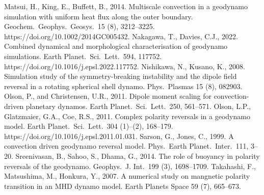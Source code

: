 \begin{thebibliography}{}
%
%
Matsui, H., King, E., Buffett, B., 2014. Multiscale convection in a geodynamo simulation with uniform heat flux along the outer boundary. Geochem.\ Geophys.\ Geosys.\ 15 (8), 3212--3225. https://doi.org/10.1002/2014GC005432.
%
%
{\color{red}
Nakagawa, T., Davies, C.J., 2022. Combined dynamical and morphological characterisation of geodynamo simulations. Earth Planet.\ Sci.\ Lett.\ 594, 117752. https://doi.org/10.1016/j.epsl.2022.117752.
}
%
Nishikawa, N., Kusano, K., 2008. Simulation study of the symmetry-breaking instability and the dipole field reversal in a rotating spherical shell dynamo. Phys.\ Plasmas 15 (8), 082903.
%
%
Olson, P., and Christensen, U.R., 2011. Dipole moment scaling for convection-driven planetary dynamos. Earth Planet.\ Sci.\ Lett.\ 250, 561--571.
%
Olson, L.P., Glatzmaier, G.A., Coe, R.S., 2011. Complex polarity reversals in a geodynamo model. Earth Planet.\ Sci.\ Lett.\ 304 (1)--(2), 168--179. https://doi.org/10.1016/j.epsl.2011.01.031.
%
Sarson, G., Jones, C., 1999. A convection driven geodynamo reversal model. Phys.\ Earth Planet.\ Inter.\ 111, 3--20.
%
Sreenivasan, B., Sahoo, S., Dhama, G., 2014. The role of buoyancy in polarity reversals of the geodynamo. Geophys.\ J. Int.\ 199 (3), 1698--1709.
%
Takahashi, F., Matsushima, M., Honkura, Y., 2007. A numerical study on mangnetic polarity transition in an MHD dynamo model. Earth Planets Space 59 (7), 665--673.

\end{thebibliography}
